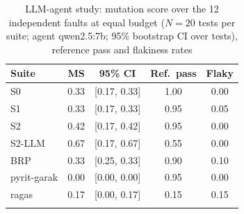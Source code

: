 \begin{table}[t]
\caption{LLM-agent study: mutation score over the 12 independent faults at equal budget ($N=20$ tests per suite; agent qwen2.5:7b; 95\% bootstrap CI over tests), reference pass and flakiness rates}
\label{tab:llm}
\footnotesize
\begin{tabular}{@{}lcccc@{}}
\toprule
Suite & MS & 95\% CI & Ref.\ pass & Flaky \\
\midrule
S0 & 0.33 & [0.17, 0.33] & 1.00 & 0.00 \\
S1 & 0.33 & [0.17, 0.33] & 0.95 & 0.05 \\
S2 & 0.42 & [0.17, 0.42] & 0.95 & 0.00 \\
S2-LLM & 0.67 & [0.17, 0.67] & 0.55 & 0.00 \\
BRP & 0.33 & [0.25, 0.33] & 0.90 & 0.10 \\
pyrit-garak & 0.00 & [0.00, 0.00] & 0.95 & 0.00 \\
ragas & 0.17 & [0.00, 0.17] & 0.15 & 0.15 \\
\botrule
\end{tabular}
\end{table}

